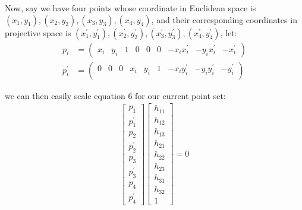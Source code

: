 \documentclass[conference]{IEEEtran}
\begin{document}
\noindent Now, say we have four points whose coordinate in Euclidean space is $(x_1, y_1), (x_2, y_2), (x_3, y_3), (x_4, y_4)$, and their corresponding coordinates in projective space is $(x_1^\prime, y_1^\prime), (x_2^\prime, y_2^\prime), (x_3^\prime, y_3^\prime), (x_4^\prime, y_4^\prime)$, let:
\begin{equation}
	\begin{split}
		p_i &= 
		\begin{pmatrix}
			x_i & y_i & 1 & 0 & 0 & 0 & -x_ix_i^\prime & -y_ix_i^\prime & -x_i^\prime
		\end{pmatrix}\\
		p_i^\prime& = 
		\begin{pmatrix}
			0 & 0 & 0 & x_i & y_i & 1 & -x_iy_i^\prime & -y_iy_i^\prime & -y_i^\prime \\
		\end{pmatrix}
	\end{split}
\end{equation}

\noindent we can then easily scale equation 6 for our current point set:
\begin{equation}
	\begin{split}
		\begin{bmatrix}
			p_1 \\
			p_1^\prime \\
			p_2 \\
			p_2^\prime \\
			p_3 \\
			p_3^\prime \\
			p_4 \\
			p_4^\prime
		\end{bmatrix}
		\begin{bmatrix}
			h_{11} \\
			h_{12} \\
			h_{13} \\
			h_{21} \\
			h_{22} \\
			h_{23} \\
			h_{31} \\
			h_{32} \\
			1
		\end{bmatrix} = 0
	\end{split}
\end{equation}



\end{document}
